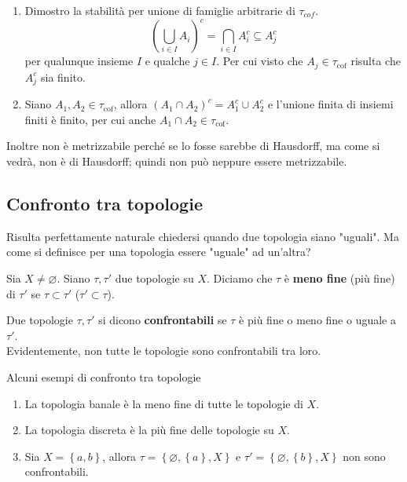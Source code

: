 \begin{example}
\begin{enumerate}
\begin{enumerate}
		\item Dimostro la stabilità per unione di famiglie arbitrarie di $\tau_{cof}$.
			\begin{equation*}
					\left(\bigcup_{i \in I} A_i\right)^c = \bigcap_{i \in I} A^c_i \subseteq A^c_j
			\end{equation*}
		per qualunque insieme $I$ e qualche $j \in I$. Per cui visto che $A_j \in \tau_{\text{cof}}$ risulta che $A^c_j$ sia finito.
		\item Siano $A_1, A_2 \in \tau_{\text{cof}}$, allora $(A_1 \cap A_2)^c = A^c_1 \cup A^c_2$ e l'unione finita di insiemi finiti è finito, per cui anche $A_1 \cap A_2 \in \tau_{\text{cof}}$. 
	\end{enumerate}	
	Inoltre non è metrizzabile perché se lo fosse sarebbe di Hausdorff, ma come si vedrà, non è di Hausdorff; quindi non può neppure essere metrizzabile.
\end{enumerate}
\end{example}



\subsection{\textcolor{TopGener}{\textbf{Confronto tra topologie}}}
Risulta perfettamente naturale chiedersi quando due topologia siano "uguali". Ma come si definisce per una topologia essere "uguale" ad un'altra?



\begin{definition}
	Sia $X \neq \varnothing$. Siano $\tau, \tau'$ due topologie su $X$. Diciamo che $\tau$ è \textbf{meno fine} (più fine) di $\tau'$ se $\tau \subset \tau'$ ($\tau' \subset \tau$).
\end{definition}

\begin{definition}
	Due topologie $\tau, \tau'$ si dicono \textbf{confrontabili} se $\tau$ è più fine o meno fine o uguale a $\tau'$. \\ Evidentemente, non tutte le topologie sono confrontabili tra loro.
\end{definition}

\begin{example}
	Alcuni esempi di confronto tra topologie
	\begin{enumerate}
		\item La topologia banale è la meno fine di tutte le topologie di $X$.
		\item La topologia discreta è la più fine delle topologie su $X$.
		\item Sia $X = \left\{a,b\right\}$, allora $\tau = \left\{\varnothing,\left\{a\right\}, X\right\}$ e $\tau' = \left\{\varnothing, \left\{b\right\}, X\right\}$ non sono confrontabili.
	\end{enumerate}
\end{example}




